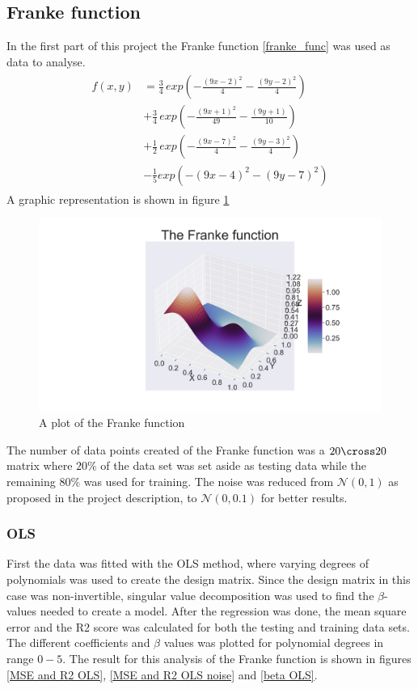 \thispagestyle{plain}
\subsection{Franke function}
\noindent In the first part of this project the Franke function \eqref{franke_func} was used as data to analyse.
%
\begin{align} \label{franke_func}
\begin{split}
    f(x,y) &= \frac{3}{4} \, exp\left(- \frac{(9x-2)^2}{4} - \frac{(9y-2)^2}{4}\right) \\
    &+ \frac{3}{4}\, exp\left( - \frac{(9x +1)^2}{49} - \frac{(9y+1)}{10}\right) \\
    &+ \frac{1}{2}\, exp\left( -\frac{(9x-7)^2}{4} - \frac{(9y-3)^2}{4}\right) \\
    &- \frac{1}{5} exp \left( - (9x -4)^2 - (9y-7)^2\right) 
\end{split}
\end{align}
A graphic representation is shown in figure \ref{fig:franke_3d}
\begin{figure}[h]\label{fig:franke_3d}
	\centering
	\includegraphics[width=\linewidth]{images/Figure_1.png}
	\caption{\centering A plot of the Franke function }
\end{figure}
%
The number of data points created of the Franke function was a $20 \cross 20$ matrix where $20\%$
of the data set was set aside as testing data while the remaining $80\%$ was used for training. The noise was reduced from $\mathcal{N}(0,1)$ as proposed in the project description, to $\mathcal{N}(0,0.1)$ for better results.

\subsubsection{OLS}
\noindent First the data was fitted with the OLS method, where varying degrees of polynomials was used to create the design matrix. Since the design matrix in this case was non-invertible, singular value decomposition was used to find the $\beta$-values needed to create a model. After the regression was done, the mean square error and the R2 score was calculated for both the testing and training data sets. The different coefficients and $\beta$ values was plotted for polynomial degrees in range $0-5$. The result for this analysis of the Franke function is shown in figures \eqref{MSE and R2 OLS}, \eqref{MSE and R2 OLS noise} and \eqref{beta OLS}.

